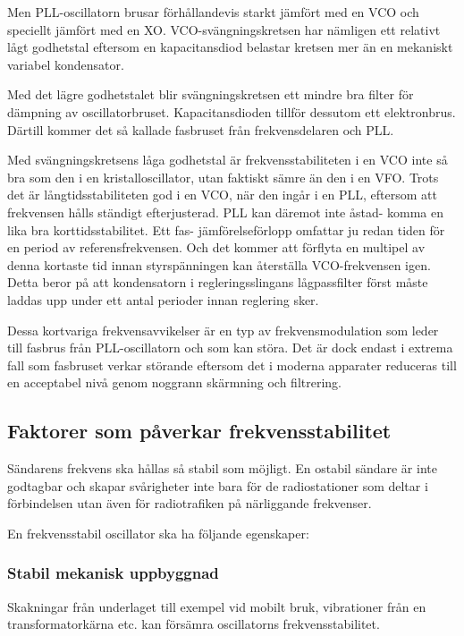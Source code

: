 Men PLL-oscillatorn brusar förhållandevis starkt jämfört med en VCO och
speciellt jämfört med en XO.
VCO-svängningskretsen har nämligen ett relativt lågt godhetstal eftersom en
kapacitansdiod belastar kretsen mer än en mekaniskt variabel kondensator.

Med det lägre godhetstalet blir svängningskretsen ett mindre bra
filter för dämpning av oscillatorbruset.
Kapacitansdioden tillför dessutom ett elektronbrus.
Därtill kommer det så kallade fasbruset från frekvensdelaren och PLL.

Med svängningskretsens låga godhetstal är frekvensstabiliteten i en VCO inte så
bra som den i en kristalloscillator, utan faktiskt sämre än den i en VFO.
Trots det är långtidsstabiliteten god i en VCO, när den ingår i en PLL,
eftersom att frekvensen hålls ständigt efterjusterad.
PLL kan däremot inte åstad- komma en lika bra korttidsstabilitet.
Ett fas- jämförelseförlopp omfattar ju redan tiden för en period av
referensfrekvensen.
Och det kommer att förflyta en multipel av denna kortaste tid innan
styrspänningen kan återställa VCO-frekvensen igen.
Detta beror på att kondensatorn i regleringsslingans lågpassfilter först måste
laddas upp under ett antal perioder innan reglering sker.

Dessa kortvariga frekvensavvikelser är en typ av frekvensmodulation
som leder till fasbrus från PLL-oscillatorn och som kan störa.
Det är dock endast i extrema fall som fasbruset verkar störande eftersom det
i moderna apparater reduceras till en acceptabel nivå genom noggrann
skärmning och filtrering.

\subsection{Faktorer som påverkar frekvensstabilitet}

Sändarens frekvens ska hållas så stabil som möjligt.
En ostabil sändare är inte godtagbar och skapar svårigheter inte bara för de
radiostationer som deltar i förbindelsen utan även för radiotrafiken
på närliggande frekvenser.

En frekvensstabil oscillator ska ha följande egenskaper:

\subsubsection{Stabil mekanisk uppbyggnad}

Skakningar från underlaget till exempel vid mobilt bruk, vibrationer från en
transformatorkärna etc. kan försämra oscillatorns frekvensstabilitet.

